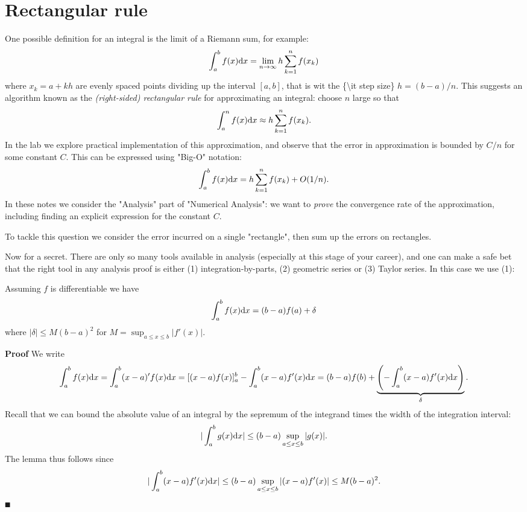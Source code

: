 
\section{Rectangular rule}
One possible definition for an integral is the limit of a Riemann sum, for example:
\[
  \ensuremath{\int}_a^b f(x) {\rm d}x = \lim_{n \ensuremath{\rightarrow} \ensuremath{\infty}} h \ensuremath{\sum}_{k=1}^n f(x_k)
\]
where $x_k = a+kh$ are evenly spaced points dividing up the interval $[a,b]$, that is  wit the \{{\textbackslash}it step size\} $h = (b-a)/n$. This suggests an algorithm known as the \emph{(right-sided) rectangular rule} for approximating an integral: choose $n$ large so that
\[
  \ensuremath{\int}_a^n f(x) {\rm d}x \ensuremath{\approx} h \ensuremath{\sum}_{k=1}^n f(x_k).
\]
In the lab we explore practical implementation of this approximation, and observe that the error in approximation is bounded by $C/n$ for some constant $C$. This can be expressed using "Big-O" notation:
\[
\ensuremath{\int}_a^b f(x) {\rm d}x = h \ensuremath{\sum}_{k=1}^n f(x_k) + O(1/n).
\]
In these notes we consider the "Analysis" part of "Numerical Analysis": we want to \emph{prove} the convergence rate of the approximation, including finding an explicit expression for the constant $C$.

To tackle this question we consider the error incurred on a single "rectangle", then sum up the errors on rectangles.

Now for a secret. There are only so many tools available in analysis (especially at this stage of your career), and  one can make a safe bet that the right tool in any analysis proof is either (1) integration-by-parts, (2) geometric series or (3) Taylor series. In this case we use (1):

\begin{lemma} Assuming $f$ is differentiable we have
\[
\ensuremath{\int}_a^b f(x) {\rm d}x = (b-a) f(a) +  \ensuremath{\delta}
\]
where $|\ensuremath{\delta}| \ensuremath{\leq} M (b-a)^2$ for $M = \sup_{a \ensuremath{\leq} x \ensuremath{\leq} b}|f'(x)|$.

\end{lemma}
\textbf{Proof} We write
\[
\ensuremath{\int}_a^b f(x) {\rm d}x = \ensuremath{\int}_a^b (x-a)' f(x)  {\rm d}x = [(x-a) f(x)]_a^b - \ensuremath{\int}_a^b (x-a) f'(x) {\rm d} x
= (b-a) f(b) + \underbrace{\left(-\ensuremath{\int}_a^b (x-a) f'(x) {\rm d} x \right)}_{\ensuremath{\delta}}.
\]
Recall that we can bound the absolute value of an integral by the sepremum of the integrand times the width of the integration interval:
\[
|\ensuremath{\int}_a^b g(x) {\rm d} x| \ensuremath{\leq} (b-a) \sup_{a \ensuremath{\leq} x \ensuremath{\leq} b}|g(x)|.
\]
The lemma thus follows since
\[
|\ensuremath{\int}_a^b (x-a) f'(x) {\rm d} x| \ensuremath{\leq} (b-a) \sup_{a \ensuremath{\leq} x \ensuremath{\leq} b}|(x-a) f'(x)| \ensuremath{\leq} M (b-a)^2.
\]
\ensuremath{\QED}

